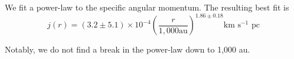 We fit a power-law to the specific angular momentum. 
The resulting best fit is 
\begin{equation}
j(r) = (3.2\pm5.1)\times 10^{-4}\left( \frac{r}{1,000 \textrm{au}}\right)^{1.86\pm0.18} \textrm{km s$^{-1}$ pc}
\end{equation}
  
Notably, we do not find a break in the power-law down to 1,000 au.
  
  